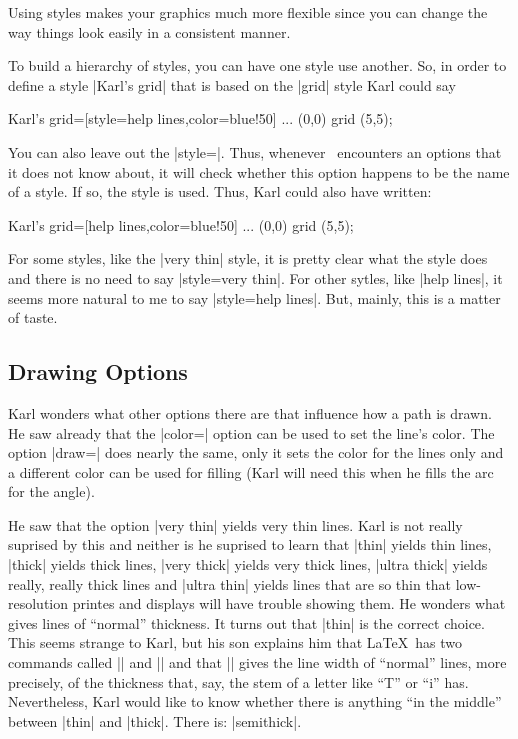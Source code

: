 Using styles makes your graphics much more flexible since you can
change the way things look easily in a consistent manner.

To build a hierarchy of styles, you can have one style use
another. So, in order to define a style |Karl's grid| that is based on
the |grid| style Karl could say
\begin{codeexample}
\tikzstyle Karl's grid=[style=help lines,color=blue!50]
...
\draw[sytle=Karl's grid] (0,0) grid (5,5);
\end{codeexample}

You can also leave out the |style=|. Thus, whenever \tikzname\ encounters
an options that it does not know about, it will check whether this
option happens to be the name of a style. If so, the style is
used. Thus, Karl could also have written:
\begin{codeexample}
\tikzstyle Karl's grid=[help lines,color=blue!50]
...
 (0,0) grid (5,5);
\end{codeexample}

For some styles, like the |very thin| style, it is pretty clear what
the style does and there is no need to say |style=very thin|. For
other sytles, like |help lines|, it seems more natural to me to say
|style=help lines|. But, mainly, this is a matter of taste.


\subsection{Drawing Options}

Karl wonders what other options there are that influence how a path is
drawn. He saw already that the |color=| option can be used
to set the line's color. The option |draw=| does nearly
the same, only it sets the color for the lines only and a different
color can be used for filling (Karl will need this when he fills the
arc for the angle).

He saw that the option |very thin| yields very thin lines. Karl is not
really suprised by this and neither is he suprised to learn that |thin|
yields thin lines,  |thick| yields thick lines, |very thick| yields
very thick lines, |ultra thick| yields really, really thick lines and
|ultra thin| yields lines that are so thin that low-resolution printes
and displays will have trouble showing them. He wonders what gives
lines of ``normal'' thickness. It turns out that |thin| is the correct
choice. This seems strange to Karl, but his son explains him that
\LaTeX\ has two commands called |\thinlines| and |\thicklines| and
that |\thinlines| gives the line width of ``normal'' lines, more
precisely, of the thickness that, say, the stem of a letter like ``T''
or ``i'' has. Nevertheless, Karl would like to know whether there is
anything ``in the middle'' between |thin| and |thick|. There is:
|semithick|.

